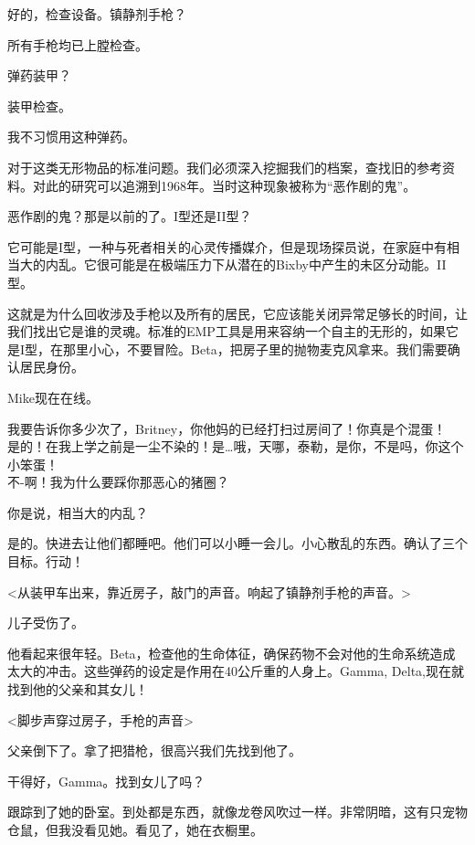 \begin{scpbox}

好的，检查设备。镇静剂手枪？

所有手枪均已上膛检查。

弹药装甲？

装甲检查。

 我不习惯用这种弹药。

 对于这类无形物品的标准问题。我们必须深入挖掘我们的档案，查找旧的参考资料。对此的研究可以追溯到1968年。当时这种现象被称为“恶作剧的鬼”。

恶作剧的鬼？那是以前的了。I型还是II型？

它可能是I型，一种与死者相关的心灵传播媒介，但是现场探员说，在家庭中有相当大的内乱。它很可能是在极端压力下从潜在的Bixby中产生的未区分动能。II型。

这就是为什么回收涉及手枪以及所有的居民，它应该能关闭异常足够长的时间，让我们找出它是谁的灵魂。标准的EMP工具是用来容纳一个自主的无形的，如果它是I型，在那里小心，不要冒险。Beta，把房子里的抛物麦克风拿来。我们需要确认居民身份。

 Mike现在在线。

我要告诉你多少次了，Britney，你他妈的已经打扫过房间了！你真是个混蛋！\\
是的！在我上学之前是一尘不染的！是…哦，天哪，泰勒，是你，不是吗，你这个小笨蛋！\\
不-啊！我为什么要踩你那恶心的猪圈？

你是说，相当大的内乱？

是的。快进去让他们都睡吧。他们可以小睡一会儿。小心散乱的东西。确认了三个目标。行动！

<从装甲车出来，靠近房子，敲门的声音。响起了镇静剂手枪的声音。>

儿子受伤了。

他看起来很年轻。Beta，检查他的生命体征，确保药物不会对他的生命系统造成太大的冲击。这些弹药的设定是作用在40公斤重的人身上。Gamma, Delta,现在就找到他的父亲和其女儿！

<脚步声穿过房子，手枪的声音>

父亲倒下了。拿了把猎枪，很高兴我们先找到他了。

干得好，Gamma。找到女儿了吗？

跟踪到了她的卧室。到处都是东西，就像龙卷风吹过一样。非常阴暗，这有只宠物仓鼠，但我没看见她。看见了，她在衣橱里。


\end{scpbox}
